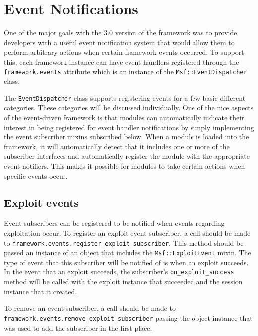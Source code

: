 \documentclass{report}
\begin{document}
    \section{Event Notifications}

\par
One of the major goals with the 3.0 version of the framework was to
provide developers with a useful event notification system that
would allow them to perform arbitrary actions when certain framework
events occurred.  To support this, each framework instance can have
event handlers registered through the \texttt{framework.events}
attribute which is an instance of the \texttt{Msf::EventDispatcher}
class.

\par
The \texttt{EventDispatcher} class supports registering events for a
few basic different categories.  These categories will be discussed
individually.  One of the nice aspects of the event-driven framework
is that modules can automatically indicate their interest in being
registered for event handler notifications by simply implementing
the event subscriber mixins subscribed below.  When a module is
loaded into the framework, it will automatically detect that it
includes one or more of the subscriber interfaces and automatically
register the module with the appropriate event notifiers.  This
makes it possible for modules to take certain actions when specific
events occur.

        \subsection{Exploit events}

\par
Event subscribers can be registered to be notified when events
regarding exploitation occur.  To register an exploit event
subscriber, a call should be made to
\texttt{framework.events.register\_exploit\_subscriber}.  This
method should be passed an instance of an object that includes the
\texttt{Msf::ExploitEvent} mixin.  The type of event that this
subscriber will be notified of is when an exploit succeeds.  In the
event that an exploit succeeds, the subscriber's
\texttt{on\_exploit\_success} method will be called with the exploit
instance that succeeded and the session instance that it created.

\par
To remove an event subscriber, a call should be made to\\
\texttt{framework.events.remove\_exploit\_subscriber} passing the
object instance that was used to add the subscriber in the first
place.
\end{document}

